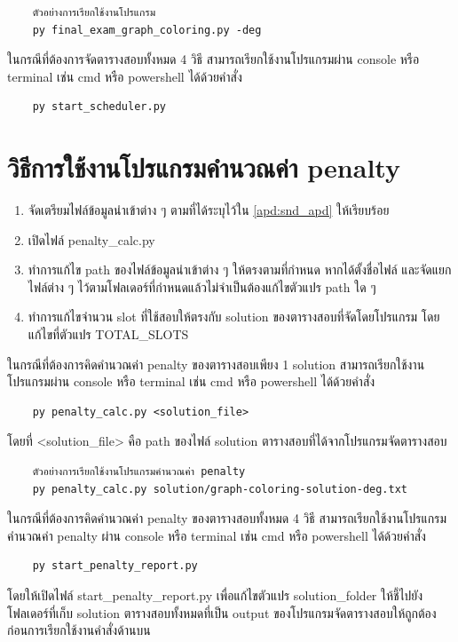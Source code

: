 \begin{verbatim}
    ตัวอย่างการเรียกใช้งานโปรแกรม
    py final_exam_graph_coloring.py -deg
\end{verbatim}

\noindent ในกรณีที่ต้องการจัดตารางสอบทั้งหมด 4 วิธี สามารถเรียกใช้งานโปรแกรมผ่าน console หรือ terminal เช่น cmd หรือ powershell ได้ด้วยคำสั่ง
\begin{verbatim}
    py start_scheduler.py
\end{verbatim}
\section{วิธีการใช้งานโปรแกรมคำนวณค่า penalty}
\begin{enumerate}
    \item จัดเตรียมไฟล์ข้อมูลนำเข้าต่าง ๆ ตามที่ได้ระบุไว้ใน \ref{apd:snd_apd} ให้เรียบร้อย
    \item เปิดไฟล์ penalty\_calc.py
    \item ทำการแก้ไข path ของไฟล์ข้อมูลนำเข้าต่าง ๆ ให้ตรงตามที่กำหนด หากได้ตั้งชื่อไฟล์ และจัดแยกไฟล์ต่าง ๆ ไว้ตามโฟลเดอร์ที่กำหนดแล้วไม่จำเป็นต้องแก้ไขตัวแปร path ใด ๆ
    \item ทำการแก้ไขจำนวน slot ที่ใช้สอบให้ตรงกับ solution ของตารางสอบที่จัดโดยโปรแกรม โดยแก้ไขที่ตัวแปร TOTAL\_SLOTS
\end{enumerate}
ในกรณีที่ต้องการคิดคำนวณค่า penalty ของตารางสอบเพียง 1 solution สามารถเรียกใช้งานโปรแกรมผ่าน console หรือ terminal เช่น cmd หรือ powershell ได้ด้วยคำสั่ง 
\begin{verbatim}
    py penalty_calc.py <solution_file>
\end{verbatim}
โดยที่ <solution\_file> คือ path ของไฟล์ solution ตารางสอบที่ได้จากโปรแกรมจัดตารางสอบ

\begin{verbatim}
    ตัวอย่างการเรียกใช้งานโปรแกรมคำนวณค่า penalty
    py penalty_calc.py solution/graph-coloring-solution-deg.txt
\end{verbatim}

\noindent ในกรณีที่ต้องการคิดคำนวณค่า penalty ของตารางสอบทั้งหมด 4 วิธี สามารถเรียกใช้งานโปรแกรมคำนวณค่า penalty ผ่าน console หรือ terminal เช่น cmd หรือ powershell ได้ด้วยคำสั่ง
\begin{verbatim}
    py start_penalty_report.py
\end{verbatim}
โดยให้เปิดไฟล์ start\_penalty\_report.py เพื่อแก้ไขตัวแปร solution\_folder ให้ชี้ไปยังโฟลเดอร์ที่เก็บ solution ตารางสอบทั้งหมดที่เป็น output ของโปรแกรมจัดตารางสอบให้ถูกต้องก่อนการเรียกใช้งานคำสั่งด้านบน